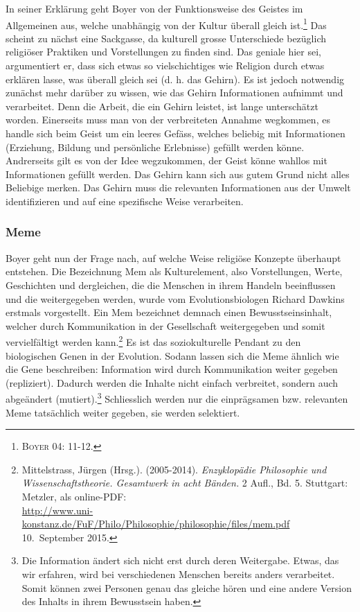 In seiner Erklärung geht Boyer von der Funktionsweise des Geistes im Allgemeinen aus, welche unabhängig von der Kultur überall gleich ist.\footnote{\textsc{Boyer 04: 11-12.}} Das scheint zu nächst eine Sackgasse, da kulturell grosse Unterschiede bezüglich religiöser Praktiken und Vorstellungen zu finden sind. Das geniale hier sei, argumentiert er, dass sich etwas so vielschichtiges wie Religion durch etwas erklären lasse, was überall gleich sei (d. h. das Gehirn). Es ist jedoch notwendig zunächst mehr darüber zu wissen, wie das Gehirn Informationen aufnimmt und verarbeitet. Denn die Arbeit, die ein Gehirn leistet, ist lange unterschätzt worden. Einerseits muss man von der verbreiteten Annahme wegkommen, es handle sich beim Geist um ein leeres Gefäss, welches beliebig mit Informationen (Erziehung, Bildung und persönliche Erlebnisse) gefüllt werden könne. Andrerseits gilt es von der Idee wegzukommen, der Geist könne wahllos mit Informationen gefüllt werden. Das Gehirn kann sich aus gutem Grund nicht alles Beliebige merken. Das Gehirn muss die relevanten Informationen aus der Umwelt identifizieren und auf eine spezifische Weise verarbeiten. 

\subsubsection{Meme}
Boyer geht nun der Frage nach, auf welche Weise religiöse Konzepte überhaupt entstehen. Die Bezeichnung Mem als Kulturelement, also Vorstellungen, Werte, Geschichten und dergleichen, die die Menschen in ihrem Handeln beeinflussen und die weitergegeben werden, wurde vom Evolutionsbiologen Richard Dawkins erstmals vorgestellt. Ein Mem bezeichnet demnach einen Bewusstseinsinhalt, welcher durch Kommunikation in der Gesellschaft weitergegeben und somit vervielfältigt werden kann.\footnote{Mittelstrass, Jürgen (Hrsg.). (2005-2014). \emph{Enzyklopädie Philosophie und Wissenschaftstheorie. Gesamtwerk in acht Bänden.} 2 Aufl., Bd. 5. Stuttgart: Metzler, als online-PDF:\\ \url{http://www.uni-konstanz.de/FuF/Philo/Philosophie/philosophie/files/mem.pdf} 10.~September 2015.} Es ist das soziokulturelle Pendant zu den biologischen Genen in der Evolution. Sodann lassen sich die Meme ähnlich wie die Gene beschreiben: Information wird durch Kommunikation weiter gegeben (repliziert). Dadurch werden die Inhalte nicht einfach verbreitet, sondern auch abgeändert (mutiert).\footnote{Die Information ändert sich nicht erst durch deren Weitergabe. Etwas, das wir erfahren, wird bei verschiedenen Menschen bereits anders verarbeitet. Somit können zwei Personen genau das gleiche hören und eine andere Version des Inhalts in ihrem Bewusstsein haben.} Schliesslich werden nur die einprägsamen bzw. relevanten Meme tatsächlich weiter gegeben, sie werden selektiert.

